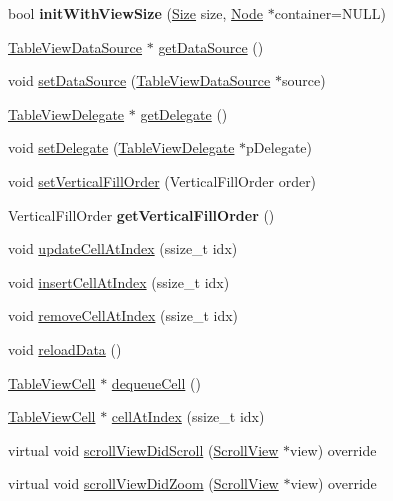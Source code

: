 \begin{DoxyCompactItemize}
bool {\bfseries init\+With\+View\+Size} (\hyperlink{classSize}{Size} size, \hyperlink{classNode}{Node} $\ast$container=N\+U\+LL)
\item 
\hyperlink{classTableViewDataSource}{Table\+View\+Data\+Source} $\ast$ \hyperlink{classTableView_aca51ba7a0f81e6e3c80056733665cd5a}{get\+Data\+Source} ()
\item 
void \hyperlink{classTableView_a3871ed3e4b512026027371680dd23159}{set\+Data\+Source} (\hyperlink{classTableViewDataSource}{Table\+View\+Data\+Source} $\ast$source)
\item 
\hyperlink{classTableViewDelegate}{Table\+View\+Delegate} $\ast$ \hyperlink{classTableView_a1530f5f201ca31501a85e27a3b45453f}{get\+Delegate} ()
\item 
void \hyperlink{classTableView_afb2bffdd669f02feb74e2534d477dc1b}{set\+Delegate} (\hyperlink{classTableViewDelegate}{Table\+View\+Delegate} $\ast$p\+Delegate)
\item 
void \hyperlink{classTableView_a687ac9ecccbb967c84322cc69de6336e}{set\+Vertical\+Fill\+Order} (Vertical\+Fill\+Order order)
\item 
\mbox{\label{classTableView_a1723e663a00db8587c5a35e91d25eaf1}} 
Vertical\+Fill\+Order {\bfseries get\+Vertical\+Fill\+Order} ()
\item 
void \hyperlink{classTableView_a98a5e4c9b7c7841fb9ecb15604bd3dc5}{update\+Cell\+At\+Index} (ssize\+\_\+t idx)
\item 
void \hyperlink{classTableView_a78419c05170575d818d08809dfab0b2f}{insert\+Cell\+At\+Index} (ssize\+\_\+t idx)
\item 
void \hyperlink{classTableView_afaef50b9df2cc2c3d34bb157d046f73f}{remove\+Cell\+At\+Index} (ssize\+\_\+t idx)
\item 
void \hyperlink{classTableView_ad142e6fbf0bf66d2d27fdb616a8a726c}{reload\+Data} ()
\item 
\hyperlink{classTableViewCell}{Table\+View\+Cell} $\ast$ \hyperlink{classTableView_a262343ca04059c20bc870a218e9ab800}{dequeue\+Cell} ()
\item 
\hyperlink{classTableViewCell}{Table\+View\+Cell} $\ast$ \hyperlink{classTableView_a90574ea8dfa630cd2b4354ae134b8731}{cell\+At\+Index} (ssize\+\_\+t idx)
\item 
virtual void \hyperlink{classTableView_ac81b28599ca1bad73bf28b8d2e3d72bf}{scroll\+View\+Did\+Scroll} (\hyperlink{classScrollView}{Scroll\+View} $\ast$view) override
\item 
virtual void \hyperlink{classTableView_a5c83605ee0059fa74e9c184301cbb368}{scroll\+View\+Did\+Zoom} (\hyperlink{classScrollView}{Scroll\+View} $\ast$view) override

\end{DoxyCompactItemize}
